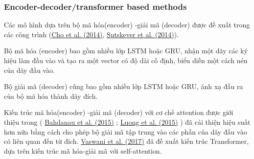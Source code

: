 \newpage
\subsubsection{Encoder-decoder/transformer based methods}
\begin{singlespace}
    Các mô hình dựa trên bộ mã hóa(encoder) -giải mã (decoder) được đề xuất trong các công trình
    (\href{https://www.sciencedirect.com/science/article/pii/S2667305323000698#br0250}{Cho et al. (2014)}, \href{https://www.sciencedirect.com/science/article/pii/S2667305323000698#br1350}{Sutskever et al. (2014)}).
\end{singlespace}

\begin{singlespace}
    Bộ mã hóa (encoder) bao gồm nhiều lớp LSTM hoặc GRU, nhận một dãy các ký hiệu làm đầu vào và tạo ra một vector có độ dài cố định,
    biểu diễn một cách nén của dãy đầu vào.
\end{singlespace}

\begin{singlespace}
    Bộ giải mã (decoder) cũng bao gồm nhiều lớp LSTM hoặc GRU, ánh xạ đầu ra của bộ mã hóa thành
    dãy đích.
\end{singlespace}

\begin{singlespace}
    Kiến trúc mã hóa(encoder) -giải mã (decoder) với cơ chế attention được giới thiệu trong (
    \href{http://arxiv.org/abs/1409.0473}{Bahdanau et al. (2015)}
    ;
    \href{https://aclanthology.org/D15-1166}{Luong et al. (2015)}
    ) đã cải thiện hiệu suất hơn nữa bằng cách cho phép bộ giải mã tập trung vào các phần của dãy đầu vào có liên quan đến từ đích.
    \href{https://scholar.google.com/scholar_lookup?title=Attention%20is%20all%20you%20need&publication_year=2017&author=A.%20Vaswani&author=N.%20Shazeer&author=N.%20Parmar&author=J.%20Uszkoreit&author=L.%20Jones&author=A.N.%20Gomez&author=L.%20Kaiser&author=I.%20Polosukhin}{Vaswani et al. (2017)} đã đề xuất kiến trúc Transformer, dựa trên kiến trúc mã hóa-giải mã với self-attention.
\end{singlespace}



